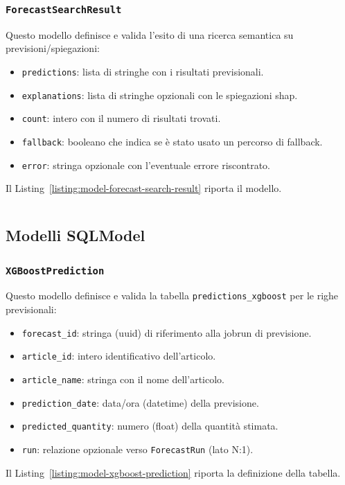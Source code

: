 \subsubsection{\texttt{ForecastSearchResult}}
Questo modello definisce e valida l’esito di una ricerca semantica su previsioni/spiegazioni:
\begin{itemize}
    \item \texttt{predictions}: lista di stringhe con i risultati previsionali.
    \item \texttt{explanations}: lista di stringhe opzionali con le spiegazioni \acrshort{shap}.
    \item \texttt{count}: intero con il numero di risultati trovati.
    \item \texttt{fallback}: booleano che indica se è stato usato un percorso di fallback.
    \item \texttt{error}: stringa opzionale con l’eventuale errore riscontrato.
\end{itemize}
Il Listing~\ref{listing:model-forecast-search-result} riporta il modello.
\begin{listing}[H]
\inputminted[fontsize=\small, breaklines, breakanywhere=true, linenos=true, bgcolor=gray!10]{python}{code/models/search_result.py}
\caption{Modello Pydantic \texttt{ForecastSearchResult}.}
\label{listing:model-forecast-search-result}
\end{listing}

\subsection{Modelli SQLModel}

\subsubsection{\texttt{XGBoostPrediction}}
Questo modello definisce e valida la tabella \texttt{predictions\_xgboost} per le righe previsionali:
\begin{itemize}
    \item \texttt{forecast\_id}: stringa (\gls{uuid}) di riferimento alla \gls{jobrun} di previsione.
    \item \texttt{article\_id}: intero identificativo dell’articolo.
    \item \texttt{article\_name}: stringa con il nome dell’articolo.
    \item \texttt{prediction\_date}: data/ora (datetime) della previsione.
    \item \texttt{predicted\_quantity}: numero (float) della quantità stimata.
    \item \texttt{run}: relazione opzionale verso \texttt{ForecastRun} (lato N:1).
\end{itemize}
Il Listing~\ref{listing:model-xgboost-prediction} riporta la definizione della tabella.
\begin{listing}[H]
\inputminted[fontsize=\small, breaklines, breakanywhere=true, linenos=true, bgcolor=gray!10]{python}{code/models/prediction.py}
\caption{Modello SQLModel \texttt{XGBoostPrediction}.}
\label{listing:model-xgboost-prediction}
\end{listing}

